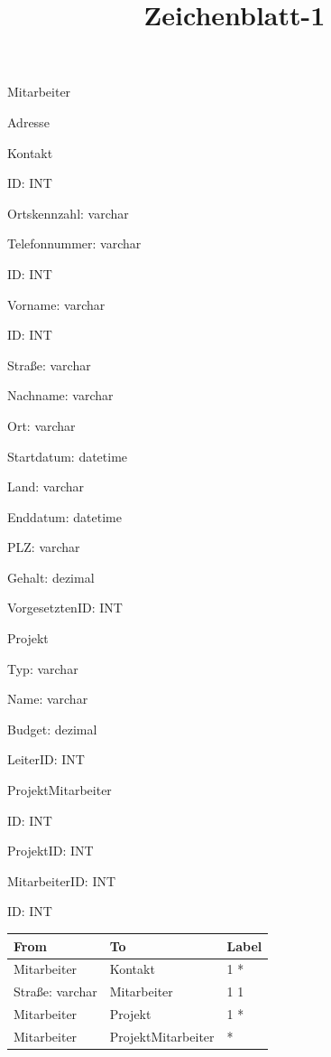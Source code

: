 \documentclass[11pt,a4paper]{article}
\title{Zeichenblatt-1}
\begin{document}
\maketitle

Mitarbeiter

Adresse

Kontakt

ID: INT

Ortskennzahl: varchar

Telefonnummer: varchar

ID: INT

Vorname: varchar

ID: INT

Straße: varchar

Nachname: varchar

Ort: varchar

Startdatum: datetime

Land: varchar

Enddatum: datetime

PLZ: varchar

Gehalt: dezimal

VorgesetztenID: INT

Projekt

Typ: varchar

Name: varchar

Budget: dezimal

LeiterID: INT

ProjektMitarbeiter

ID: INT

ProjektID: INT

MitarbeiterID: INT

ID: INT

\begin{table}[h]
\begin{tabular}{|l|l|l|}
\hline
From & To & Label \\ \hline
Mitarbeiter & Kontakt & 1 * \\ \hline
Straße: varchar & Mitarbeiter & 1 1 \\ \hline
Mitarbeiter & Projekt & 1 * \\ \hline
Mitarbeiter & ProjektMitarbeiter & * \\ \hline
\end{tabular}
\end{table}
\end{document}

